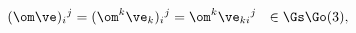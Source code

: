 \begin{equation}                                        \label{epeans}
  (\om\ve)_i{}^j=(\om^k \ve_k)_i{}^j=\om^k\ve_{ki}{}^j~~\in\Gs\Go(3),
\end{equation}

